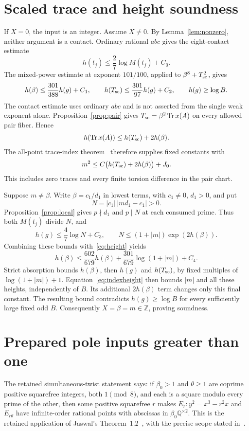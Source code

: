 \documentclass[11pt,a4paper]{article}
\newcommand{\Q}{\mathbb Q}\newcommand{\Z}{\mathbb Z}
\DeclareMathOperator{\Tr}{Tr}\DeclareMathOperator{\Nm}{Nm}
\begin{document}
\section{Scaled trace and height soundness}
If $X=0$, the input is an integer. Assume $X\ne0$.
By Lemma~\ref{lem:nonzero}, neither argument is a contact.
Ordinary rational $abc$ gives the eight-contact estimate
\cite[Section~2]{Height}
\[
                    h(t_j)\le\frac27\log M(t_j)+C_0.
\]
The mixed-power estimate at exponent $101/100$, applied to
$\beta^8+T_{\rm sc}^2$, gives
\begin{equation}\label{eq:height}
 h(\beta)\le\frac{301}{388}h(g)+C_1,\qquad
 h(T_{\rm sc})\le\frac{301}{97}h(g)+C_2,\qquad h(g)\ge\log B.
\end{equation}
The contact estimate uses ordinary $abc$ and is not asserted from
the single weak exponent alone. Proposition~\ref{prop:pair} gives
$T_{\rm sc}=\beta^2\Tr x(A)$ on every allowed pair fiber. Hence
\[
              h(\Tr x(A))\le h(T_{\rm sc})+2h(\beta).
\]
The all-point trace-index theorem~\cite[Corollary~1.3]{Trace}
therefore supplies fixed constants with
\begin{equation}\label{eq:indexheight}
              m^2\le C\bigl(h(T_{\rm sc})+2h(\beta)\bigr)+J_0.
\end{equation}
This includes zero traces and every finite torsion difference in
the pair chart.

Suppose $m\ne\beta$. Write $\beta=c_1/d_1$ in lowest terms,
with $c_1\ne0$, $d_1>0$, and put
\[
                         N=|c_1|\,|md_1-c_1|>0.
\]
Proposition~\ref{prop:local} gives $p\nmid d_1$ and $p\mid N$
at each consumed prime. Thus both $M(t_j)$ divide $N$, and
\[
 h(g)\le\frac47\log N+C_3,\qquad
               N\le(1+|m|)\exp(2h(\beta)).
\]
Combining these bounds with~\eqref{eq:height} yields
\[
 h(\beta)\le\frac{602}{679}h(\beta)
        +\frac{301}{679}\log(1+|m|)+C_4.
\]
Strict absorption bounds $h(\beta)$, then $h(g)$ and
$h(T_{\rm sc})$, by fixed multiples of $\log(1+|m|)+1$.
Equation~\eqref{eq:indexheight} then bounds $|m|$ and all these
heights, independently of $B$. Its additional $2h(\beta)$ term
changes only this final constant. The resulting bound contradicts
$h(g)\ge\log B$ for every sufficiently large fixed odd $B$.
Consequently $X=\beta=m\in\Z$, proving soundness.

\section{Prepared pole inputs greater than one}\label{sec:pole}
The retained simultaneous-twist statement says: if $\beta_0>1$
and $\theta\ge1$ are coprime positive squarefree integers, both
$1\pmod8$, and each is a square modulo every prime of the other,
then some positive squarefree $r$ makes
$E_r:y^2=x^3-r^2x$ and $E_{r\theta}$ have infinite-order rational
points with abscissas in $\beta_0\Q^{\times2}$.
This is the retained application of Jaswal's
Theorem~1.2~\cite{Jaswal}, with the precise scope stated in~\cite{Pole}.
\end{document}
